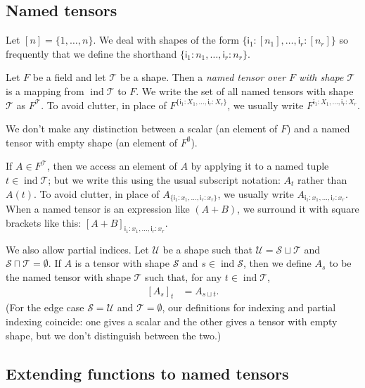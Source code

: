 \documentclass{article}
\newcommand{\name}[1]{\mathsf{#1}}
\newcommand{\tuple}[1]{\{ #1\}}
\DeclareMathOperator{\tupleshape}{ind}
\begin{document}
\subsection{Named tensors}

Let $[n] = \{1, \ldots, n\}$. We deal with shapes of the form $\tuple{\name{i}_1: [n_1], \ldots, \name{i}_r: [n_r]}$ so frequently that we define the shorthand $\tuple{\name{i}_1: n_1, \ldots, \name{i}_r: n_r}$.

Let $F$ be a field and let $\mathcal{T}$ be a shape. Then a \emph{named tensor over $F$ with shape $\mathcal{T}$} is a mapping from $\tupleshape \mathcal{T}$ to $F$. We write the set of all named tensors with shape $\mathcal{T}$ as $F^{\mathcal{T}}$. To avoid clutter, in place of $F^{\tuple{\name{i}_1: X_1, \ldots, \name{i}_r: X_r}}$, we usually write $F^{\name{i}_1: X_1, \ldots, \name{i}_r: X_r}$.

We don't make any distinction between a scalar (an element of $F$) and a named tensor with empty shape (an element of $F^\emptyset$).

If $A \in F^{\mathcal{T}}$, then we access an element of $A$ by applying it to a named tuple $t \in \tupleshape\mathcal{T}$; but we write this using the usual subscript notation: $A_t$ rather than $A(t)$. To avoid clutter, in place of $A_{\tuple{\name{i}_1: x_1, \ldots, \name{i}_r: x_r}}$, we usually write $A_{\name{i}_1: x_1, \ldots, \name{i}_r: x_r}$. When a named tensor is an expression like $(A+B)$, we surround it with square brackets like this: $[A+B]_{\name{i}_1: x_1, \ldots, \name{i}_r: x_r}$.

We also allow partial indices. Let $\mathcal{U}$ be a shape such that $\mathcal{U} = \mathcal{S} \sqcup \mathcal{T}$ and $\mathcal{S} \sqcap \mathcal{T} = \emptyset$.
If $A$ is a tensor with shape $\mathcal{S}$ and $s \in \tupleshape \mathcal{S}$, then we define $A_s$ to be the named tensor with shape $\mathcal{T}$ such that, for any $t \in \tupleshape \mathcal{T}$,
\begin{align*}
\left[A_s\right]_t &= A_{s \sqcup t}.
\end{align*}
(For the edge case $\mathcal{S} = \mathcal{U}$ and $\mathcal{T} = \emptyset$, our definitions for indexing and partial indexing coincide: one gives a scalar and the other gives a tensor with empty shape, but we don't distinguish between the two.)

\subsection{Extending functions to named tensors}
\label{sec:tensorfunctions}
\end{document}
